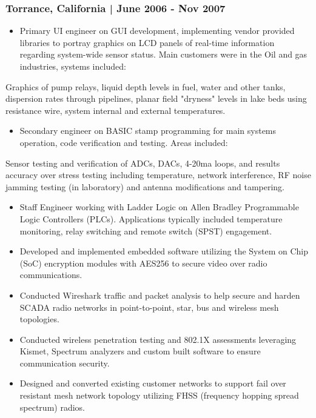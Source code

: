 \documentclass[letter,10pt]{article}
\begin{document}
\subsubsection*{Torrance, California | June 2006 - Nov 2007}
\label{sec:orgb0a857b}
\begin{itemize}
\item Primary UI engineer on GUI development, implementing vendor provided libraries to portray graphics on LCD panels of real-time information regarding system-wide sensor status. Main customers were in the Oil and gas industries, systems included:
\end{itemize}
Graphics of pump relays, liquid depth levels in fuel, water and other tanks, dispersion rates through pipelines, planar field "dryness" levels in lake beds using resistance wire, system internal and external temperatures.
\begin{itemize}
\item Secondary engineer on BASIC stamp programming for main systems operation, code verification and testing. Areas included:
\end{itemize}
Sensor testing and verification of ADCs, DACs, 4-20ma loops, and results accuracy over stress testing including temperature, network interference, RF noise jamming testing (in laboratory) and antenna modifications and tampering.
\begin{itemize}
\item Staff Engineer working with Ladder Logic on Allen Bradley Programmable Logic Controllers (PLCs). Applications typically included temperature monitoring, relay switching and remote switch (SPST) engagement.
\item Developed and implemented embedded software utilizing the System on Chip (SoC) encryption modules with AES256 to secure video over radio communications.
\item Conducted Wireshark traffic and packet analysis to help secure and harden SCADA radio networks in point-to-point, star, bus and wireless mesh topologies.
\item Conducted wireless penetration testing and 802.1X assessments leveraging Kismet, Spectrum analyzers and custom built software to ensure communication security.
\item Designed and converted existing customer networks to support fail over resistant mesh network topology utilizing FHSS (frequency hopping spread spectrum) radios.
\end{itemize}
\end{document}
